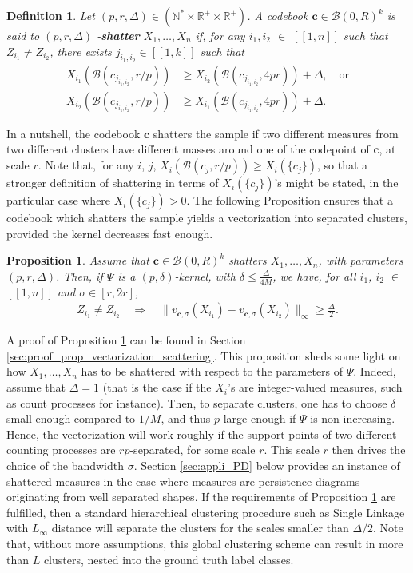 \documentclass[noinfoline,preprint]{article}
\newtheorem{defi}[theorem]{Definition}
\newtheorem{prop}[theorem]{Proposition}
\newcommand{\cb}{\mathbf{c}}
\newcommand{\R}{\mathbb{R}}
\renewcommand{\1}{\mathds 1}
\newcommand{\B}{\mathcal{B}}
\begin{document}
\begin{defi}\label{def:scatter}
Let $(p,r,\Delta) \in (\mathbb{N}^* \times \R^+ \times \R^+)$. A codebook $\cb \in \B(0,R)^k$ is said to $(p,r,\Delta)$ -\textbf{shatter} $X_1, \hdots, X_n$ if, for any $i_1, i_2$ $\in$ $[\![1,n]\!]$ such that $Z_{i_1} \neq Z_{i_2}$, there exists $j_{i_1,i_2} \in [\![1,k]\!]$ such that
\begin{align*}
X_{i_1}(\B(c_{j_{i_1,i_2}},r/p)) & \geq  X_{i_2}(\B(c_{j_{i_1,i_2}},4pr)) + \Delta, \quad \mbox{or} \\
X_{i_2}(\B(c_{j_{i_1,i_2}},r/p)) & \geq X_{i_1}(\B(c_{j_{i_1,i_2}},4pr)) + \Delta.
\end{align*}
\end{defi}
In a nutshell, the codebook $\cb$ shatters the sample if two different measures from two different clusters have different masses around one of the codepoint of $\cb$, at scale $r$. Note that, for any $i$, $j$, $X_{i}(\B(c_j,r/p)) \geq X_i(\{c_j\})$, so that a stronger definition of shattering in terms of $X_i(\{c_j\})$'s might be stated, in the particular case where $X_i(\{c_j\}) >0$. The following Proposition ensures that a codebook which shatters the sample yields a vectorization into separated clusters, provided the kernel decreases fast enough.
\begin{prop}\label{prop:vectorization_scattering}
Assume that $\cb \in \B(0,R)^k$ shatters $X_1, \hdots, X_n$, with parameters $(p,r,\Delta)$. Then, if $\Psi$ is a $(p,\delta)$-kernel, with $\delta \leq \frac{\Delta}{4M}$, we have, for all $i_1$, $i_2$ $\in$ $[\![1,n]\!]$ and $\sigma \in [r,2r]$, 
\begin{align*}
Z_{i_1} \neq Z_{i_2} \quad \Rightarrow \quad \|v_{\cb,\sigma}(X_{i_1}) - v_{\cb,\sigma}(X_{i_2})\|_\infty \geq \frac{\Delta}{2}.
\end{align*}
\end{prop}
A proof of Proposition \ref{prop:vectorization_scattering} can be found in Section \ref{sec:proof_prop_vectorization_scattering}. This proposition sheds some light on how $X_1, \hdots, X_n$ has to be shattered with respect to the parameters of $\Psi$. Indeed, assume that $\Delta=1$ (that is the case if the $X_i$'s are integer-valued measures, such as count processes for instance). Then, to separate clusters, one has to choose $\delta$ small enough compared to $1/M$, and thus $p$ large enough if $\Psi$ is non-increasing. Hence, the vectorization will work roughly if the support points of two different counting processes are $rp$-separated, for some scale $r$. This scale $r$ then drives the choice of the bandwidth $\sigma$. Section \ref{sec:appli_PD} below provides an instance of shattered measures in the case where measures are persistence diagrams originating from well separated shapes. If the requirements of Proposition \ref{prop:vectorization_scattering} are fulfilled, then a standard hierarchical clustering procedure such as Single Linkage with $L_\infty$ distance will separate the clusters for the scales smaller than $\Delta/2$. Note that, without more assumptions, this global clustering scheme can result in more than $L$ clusters, nested into the ground truth label classes. 
\end{document}
